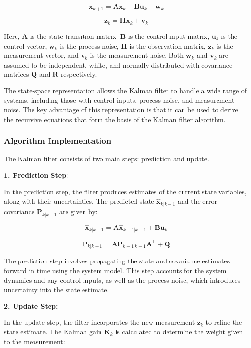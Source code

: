 \documentclass[conference]{IEEEtran}
\begin{document}
\[
    \mathbf{x}_{k+1} = \mathbf{A} \mathbf{x}_k + \mathbf{B} \mathbf{u}_k + \mathbf{w}_k
\]

\[
    \mathbf{z}_k = \mathbf{H} \mathbf{x}_k + \mathbf{v}_k
\]

Here, \( \mathbf{A} \) is the state transition matrix, \( \mathbf{B} \) is the control input matrix,
\( \mathbf{u}_k \) is the control vector, \( \mathbf{w}_k \) is the process noise, \( \mathbf{H} \)
is the observation matrix, \( \mathbf{z}_k \) is the measurement vector, and \( \mathbf{v}_k \) is
the measurement noise. Both \( \mathbf{w}_k \) and \( \mathbf{v}_k \) are assumed to be independent,
white, and normally distributed with covariance matrices \( \mathbf{Q} \) and \( \mathbf{R} \)
respectively.

The state-space representation allows the Kalman filter to handle a wide range of systems, including
those with control inputs, process noise, and measurement noise. The key advantage of this
representation is that it can be used to derive the recursive equations that form the basis of the
Kalman filter algorithm.

\subsubsection{Algorithm Implementation}
The Kalman filter consists of two main steps: prediction and update.

\textbf{1. Prediction Step:}

In the prediction step, the filter produces estimates of the current state variables, along with
their uncertainties. The predicted state \( \hat{\mathbf{x}}_{k|k-1} \) and the error covariance
\( \mathbf{P}_{k|k-1} \) are given by:

\[
    \hat{\mathbf{x}}_{k|k-1} = \mathbf{A} \hat{\mathbf{x}}_{k-1|k-1} + \mathbf{B} \mathbf{u}_k
\]

\[
    \mathbf{P}_{k|k-1} = \mathbf{A} \mathbf{P}_{k-1|k-1} \mathbf{A}^\top + \mathbf{Q}
\]

The prediction step involves propagating the state and covariance estimates forward in time using
the system model. This step accounts for the system dynamics and any control inputs, as well as the
process noise, which introduces uncertainty into the state estimate.

\textbf{2. Update Step:}

In the update step, the filter incorporates the new measurement \( \mathbf{z}_k \) to refine the
state estimate. The Kalman gain \( \mathbf{K}_k \) is calculated to determine the weight given to
the measurement:
\end{document}
